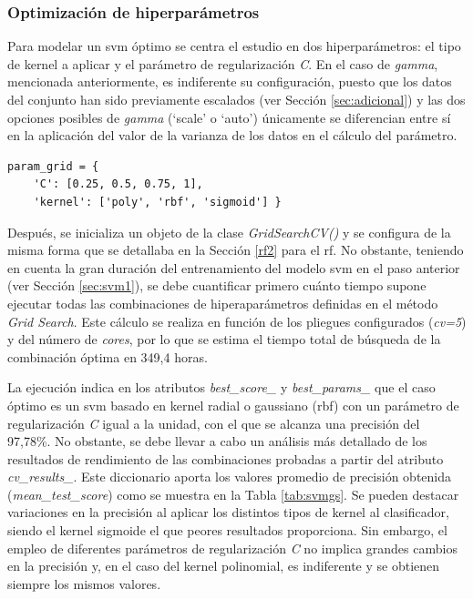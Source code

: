\subsubsection{Optimización de hiperparámetros}
\label{sec:svm2}

Para modelar un \gls{svm} óptimo se centra el estudio en dos hiperparámetros: el tipo de kernel a aplicar y el parámetro de regularización \textit{C}. En el caso de \textit{gamma}, mencionada anteriormente, es indiferente su configuración, puesto que los datos del conjunto han sido previamente escalados (ver Sección \ref{sec:adicional}) y las dos opciones posibles de \textit{gamma} (`scale' o `auto') únicamente se diferencian entre sí en la aplicación del valor de la varianza de los datos en el cálculo del parámetro. 

\vspace{3mm}

\begin{lstlisting}[style=Python, caption={Cuadrícula de parámetros SVM}]
  param_grid = {
    'C': [0.25, 0.5, 0.75, 1], 
    'kernel': ['poly', 'rbf', 'sigmoid'] }
\end{lstlisting}

\vspace{3mm}

Después, se inicializa un objeto de la clase \textit{GridSearchCV()} y se configura de la misma forma que se detallaba en la Sección \ref{rf2} para el \gls{rf}. No obstante, teniendo en cuenta la gran duración del entrenamiento del modelo \gls{svm} en el paso anterior (ver Sección \ref{sec:svm1}), se debe cuantificar primero cuánto tiempo supone ejecutar todas las combinaciones de hiperaparámetros definidas en el método \textit{Grid Search}. Este cálculo se realiza en función de los pliegues configurados (\textit{cv=5}) y del número de \textit{cores}, por lo que se estima el tiempo total de búsqueda de la combinación óptima en 349,4 horas.

\vspace{3mm}

La ejecución indica en los atributos \textit{best\_score\_} y \textit{best\_params\_} que el caso óptimo es un \gls{svm} basado en kernel radial o gaussiano (\gls{rbf}) con un parámetro de regularización \textit{C} igual a la unidad, con el que se alcanza una precisión del 97,78\%. No obstante, se debe llevar a cabo un análisis más detallado de los resultados de rendimiento de las combinaciones probadas a partir del atributo \textit{cv\_results\_}. Este diccionario aporta los valores promedio de precisión obtenida (\textit{mean\_test\_score}) como se muestra en la Tabla \ref{tab:svmgs}. Se pueden destacar variaciones en la precisión al aplicar los distintos tipos de kernel al clasificador, siendo el kernel sigmoide el que peores resultados proporciona. Sin embargo, el empleo de diferentes parámetros de regularización \textit{C} no implica grandes cambios en la precisión y, en el caso del kernel polinomial, es indiferente y se obtienen siempre los mismos valores. 

